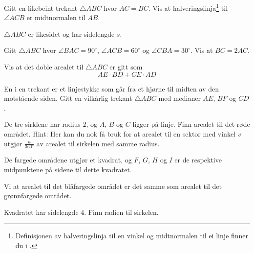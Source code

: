 Gitt en likebeint trekant $\triangle {ABC} $ hvor $ AC=BC $. Vis at halveringslinja\footnote{Definisjonen av halveringslinja til en vinkel og midtnormalen til ei linje finner du i \tmen.} til $ \angle ACB $ er midtnormalen til $ AB $.

$ \triangle ABC $ er likesidet og har sidelengde $ s $. 


Gitt $ \triangle ABC $ hvor $ \angle BAC=90^\circ $, $ \angle ACB=60^\circ $ og $ \angle CBA=30^\circ $. Vis at $ BC=2AC $.

\newpage
{}
Vis at det doble arealet til $ \triangle ABC $ er gitt som
\[ AE\cdot BD + CE\cdot AD \]


En  i en trekant er et linjestykke som går fra et hjørne til midten av den motstående siden. 
Gitt en vilkårlig trekant $ \triangle ABC $ med medianer $ AE $, $ BF $ og  $ CD $. 

\newpage
{}
De tre sirklene har radius $ 2 $, og $ A $, $ B $ og $ C $ ligger på linje.
Finn arealet til det røde området.
{\footnotesize Hint: Her kan du nok få bruk for at arealet til en sektor med vinkel $ v $ utgjør $ \frac{a}{360^\circ} $ av arealet til sirkelen med samme radius.}


De fargede områdene utgjør et kvadrat, og $ F $, $ G $, $ H $ og $ I $ er de respektive midpunktene på sidene til dette kvadratet.\os

Vi at arealet til det blåfargede området er det samme som arealet til det grønnfargede området.

Kvadratet har sidelengde 4. Finn radien til sirkelen.

